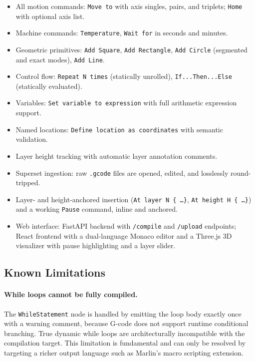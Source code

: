 \begin{itemize}
    \item[-] All motion commands: \texttt{Move to} with axis singles, pairs, and triplets; \texttt{Home} with optional axis list.
    \item[-] Machine commands: \texttt{Temperature}, \texttt{Wait for} in seconds and minutes.
    \item[-] Geometric primitives: \texttt{Add Square}, \texttt{Add Rectangle}, \texttt{Add Circle} (segmented and exact modes), \texttt{Add Line}.
    \item[-] Control flow: \texttt{Repeat N times} (statically unrolled), \texttt{If...Then...Else} (statically evaluated).
    \item[-] Variables: \texttt{Set variable to expression} with full arithmetic expression support.
    \item[-] Named locations: \texttt{Define location as coordinates} with semantic validation.
    \item[-] Layer height tracking with automatic layer annotation comments.
    \item[-] Superset ingestion: raw \texttt{.gcode} files are opened, edited, and losslessly round-tripped.
    \item[-] Layer- and height-anchored insertion (\texttt{At layer N \{ \ldots \}}, \texttt{At height H \{ \ldots \}}) and a working \texttt{Pause} command, inline and anchored.
    \item[-] Web interface: FastAPI backend with \texttt{/compile} and \texttt{/upload} endpoints; React frontend with a dual-language Monaco editor and a Three.js 3D visualizer with pause highlighting and a layer slider.
\end{itemize}

\subsection*{Known Limitations}

\paragraph{While loops cannot be fully compiled.}
The \texttt{WhileStatement} node is handled by emitting the loop body exactly once with a warning comment, because G-code does not support runtime conditional branching. True dynamic while loops are architecturally incompatible with the compilation target. This limitation is fundamental and can only be resolved by targeting a richer output language such as Marlin's macro scripting extension.

